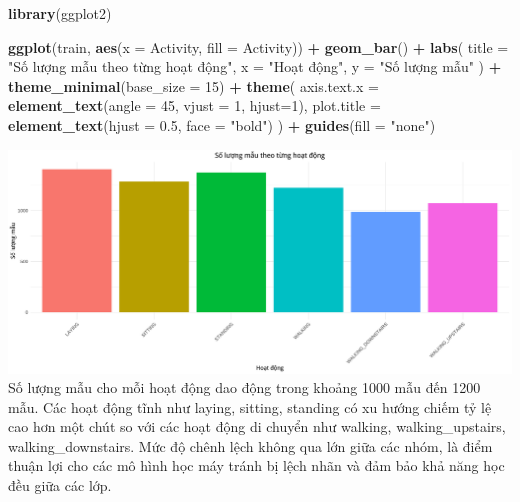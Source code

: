 \documentclass[
]{article}
\newenvironment{Shaded}{\begin{snugshade}}{\end{snugshade}}
\newcommand{\AttributeTok}[1]{\textcolor[rgb]{0.13,0.29,0.53}{#1}}
\newcommand{\DecValTok}[1]{\textcolor[rgb]{0.00,0.00,0.81}{#1}}
\newcommand{\FloatTok}[1]{\textcolor[rgb]{0.00,0.00,0.81}{#1}}
\newcommand{\FunctionTok}[1]{\textcolor[rgb]{0.13,0.29,0.53}{\textbf{#1}}}
\newcommand{\NormalTok}[1]{#1}
\newcommand{\SpecialCharTok}[1]{\textcolor[rgb]{0.81,0.36,0.00}{\textbf{#1}}}
\newcommand{\StringTok}[1]{\textcolor[rgb]{0.31,0.60,0.02}{#1}}
\begin{document}
\begin{Shaded}
\begin{Highlighting}[]
\FunctionTok{library}\NormalTok{(ggplot2)}

\FunctionTok{ggplot}\NormalTok{(train, }\FunctionTok{aes}\NormalTok{(}\AttributeTok{x =}\NormalTok{ Activity, }\AttributeTok{fill =}\NormalTok{ Activity)) }\SpecialCharTok{+}
  \FunctionTok{geom\_bar}\NormalTok{() }\SpecialCharTok{+}
  \FunctionTok{labs}\NormalTok{(}
    \AttributeTok{title =} \StringTok{"Số lượng mẫu theo từng hoạt động"}\NormalTok{,}
    \AttributeTok{x =} \StringTok{"Hoạt động"}\NormalTok{,}
    \AttributeTok{y =} \StringTok{"Số lượng mẫu"}
\NormalTok{  ) }\SpecialCharTok{+}
  \FunctionTok{theme\_minimal}\NormalTok{(}\AttributeTok{base\_size =} \DecValTok{15}\NormalTok{) }\SpecialCharTok{+}
  \FunctionTok{theme}\NormalTok{(}
    \AttributeTok{axis.text.x =} \FunctionTok{element\_text}\NormalTok{(}\AttributeTok{angle =} \DecValTok{45}\NormalTok{, }\AttributeTok{vjust =} \DecValTok{1}\NormalTok{, }\AttributeTok{hjust=}\DecValTok{1}\NormalTok{),}
    \AttributeTok{plot.title =} \FunctionTok{element\_text}\NormalTok{(}\AttributeTok{hjust =} \FloatTok{0.5}\NormalTok{, }\AttributeTok{face =} \StringTok{"bold"}\NormalTok{)}
\NormalTok{  ) }\SpecialCharTok{+}
  \FunctionTok{guides}\NormalTok{(}\AttributeTok{fill =} \StringTok{"none"}\NormalTok{)}
\end{Highlighting}
\end{Shaded}

\includegraphics{report_files/figure-latex/unnamed-chunk-12-1.pdf} Số
lượng mẫu cho mỗi hoạt động dao động trong khoảng 1000 mẫu đến 1200 mẫu.
Các hoạt động tĩnh như laying, sitting, standing có xu hướng chiếm tỷ lệ
cao hơn một chút so với các hoạt động di chuyển như walking,
walking\_upstairs, walking\_downstairs. Mức độ chênh lệch không qua lớn
giữa các nhóm, là điểm thuận lợi cho các mô hình học máy tránh bị lệch
nhãn và đảm bảo khả năng học đều giữa các lớp.
\end{document}
